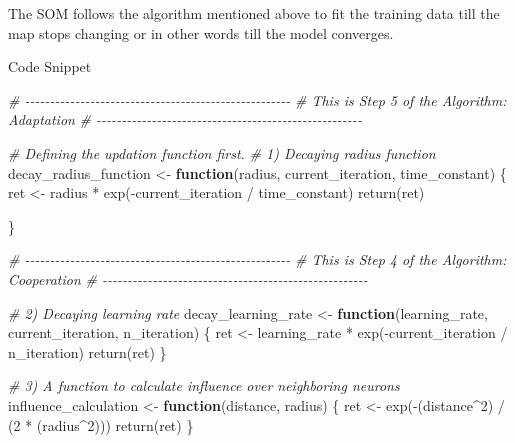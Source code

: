 \documentclass[
]{article}
\newenvironment{Shaded}{\begin{snugshade}}{\end{snugshade}}
\newcommand{\CommentTok}[1]{\textcolor[rgb]{0.56,0.35,0.01}{\textit{#1}}}
\newcommand{\ControlFlowTok}[1]{\textcolor[rgb]{0.13,0.29,0.53}{\textbf{#1}}}
\newcommand{\DecValTok}[1]{\textcolor[rgb]{0.00,0.00,0.81}{#1}}
\newcommand{\FunctionTok}[1]{\textcolor[rgb]{0.00,0.00,0.00}{#1}}
\newcommand{\NormalTok}[1]{#1}
\newcommand{\OtherTok}[1]{\textcolor[rgb]{0.56,0.35,0.01}{#1}}
\newcommand{\SpecialCharTok}[1]{\textcolor[rgb]{0.00,0.00,0.00}{#1}}
\begin{document}
The SOM follows the algorithm mentioned above to fit the training data
till the map stops changing or in other words till the model converges.

Code Snippet

\begin{Shaded}
\begin{Highlighting}[]
\CommentTok{\# {-}{-}{-}{-}{-}{-}{-}{-}{-}{-}{-}{-}{-}{-}{-}{-}{-}{-}{-}{-}{-}{-}{-}{-}{-}{-}{-}{-}{-}{-}{-}{-}{-}{-}{-}{-}{-}{-}{-}{-}{-}{-}{-}{-}{-}{-}{-}{-}{-}{-}{-}{-}{-}}
\CommentTok{\# This is Step 5 of the Algorithm: Adaptation}
\CommentTok{\# {-}{-}{-}{-}{-}{-}{-}{-}{-}{-}{-}{-}{-}{-}{-}{-}{-}{-}{-}{-}{-}{-}{-}{-}{-}{-}{-}{-}{-}{-}{-}{-}{-}{-}{-}{-}{-}{-}{-}{-}{-}{-}{-}{-}{-}{-}{-}{-}{-}{-}{-}{-}{-}}

\CommentTok{\# Defining the updation function first.}
\CommentTok{\# 1) Decaying radius function}
\NormalTok{decay\_radius\_function }\OtherTok{\textless{}{-}} \ControlFlowTok{function}\NormalTok{(radius, current\_iteration, time\_constant) \{}
\NormalTok{  ret }\OtherTok{\textless{}{-}}\NormalTok{ radius }\SpecialCharTok{*} \FunctionTok{exp}\NormalTok{(}\SpecialCharTok{{-}}\NormalTok{current\_iteration }\SpecialCharTok{/}\NormalTok{ time\_constant)}
  \FunctionTok{return}\NormalTok{(ret)}

\NormalTok{\}}

\CommentTok{\# {-}{-}{-}{-}{-}{-}{-}{-}{-}{-}{-}{-}{-}{-}{-}{-}{-}{-}{-}{-}{-}{-}{-}{-}{-}{-}{-}{-}{-}{-}{-}{-}{-}{-}{-}{-}{-}{-}{-}{-}{-}{-}{-}{-}{-}{-}{-}{-}{-}{-}{-}{-}{-}}
\CommentTok{\# This is Step 4 of the Algorithm: Cooperation}
\CommentTok{\# {-}{-}{-}{-}{-}{-}{-}{-}{-}{-}{-}{-}{-}{-}{-}{-}{-}{-}{-}{-}{-}{-}{-}{-}{-}{-}{-}{-}{-}{-}{-}{-}{-}{-}{-}{-}{-}{-}{-}{-}{-}{-}{-}{-}{-}{-}{-}{-}{-}{-}{-}{-}{-}}


\CommentTok{\# 2) Decaying learning rate}
\NormalTok{decay\_learning\_rate }\OtherTok{\textless{}{-}} \ControlFlowTok{function}\NormalTok{(learning\_rate, current\_iteration, n\_iteration) \{}
\NormalTok{  ret }\OtherTok{\textless{}{-}}\NormalTok{ learning\_rate }\SpecialCharTok{*} \FunctionTok{exp}\NormalTok{(}\SpecialCharTok{{-}}\NormalTok{current\_iteration }\SpecialCharTok{/}\NormalTok{ n\_iteration)}
  \FunctionTok{return}\NormalTok{(ret)}
\NormalTok{\}}

\CommentTok{\# 3) A function to calculate influence over neighboring neurons}
\NormalTok{influence\_calculation }\OtherTok{\textless{}{-}} \ControlFlowTok{function}\NormalTok{(distance, radius) \{}
\NormalTok{  ret }\OtherTok{\textless{}{-}} \FunctionTok{exp}\NormalTok{(}\SpecialCharTok{{-}}\NormalTok{(distance}\SpecialCharTok{\^{}}\DecValTok{2}\NormalTok{) }\SpecialCharTok{/}\NormalTok{ (}\DecValTok{2} \SpecialCharTok{*}\NormalTok{ (radius}\SpecialCharTok{\^{}}\DecValTok{2}\NormalTok{)))}
  \FunctionTok{return}\NormalTok{(ret)}
\NormalTok{\}}



\end{Highlighting}
\end{Shaded}
\end{document}
